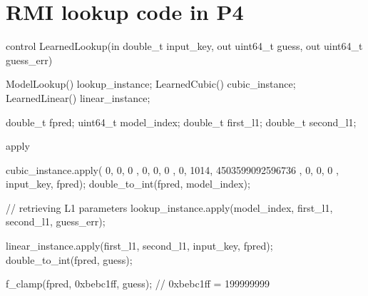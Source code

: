 \section{RMI lookup code in P4}
\label{sect:appendix:rmi_lookup}

\begin{P4}
control LearnedLookup(in double_t input_key, out uint64_t guess, out uint64_t guess_err) {
  ModelLookup() lookup_instance;
  LearnedCubic() cubic_instance;
  LearnedLinear() linear_instance;

  double_t fpred;
  uint64_t model_index;
  double_t first_l1; double_t second_l1;

  apply {
    cubic_instance.apply({ 0, 0, 0 }, { 0, 0, 0 }, { 0, 1014, 4503599092596736 }, { 0, 0, 0 }, input_key, fpred);
    double_to_int(fpred, model_index);

    // retrieving L1 parameters
    lookup_instance.apply(model_index, first_l1, second_l1, guess_err);

    linear_instance.apply(first_l1, second_l1, input_key, fpred);
    double_to_int(fpred, guess);

    f_clamp(fpred, 0xbebc1ff, guess); // 0xbebc1ff = 199999999
  }
}\end{P4}
